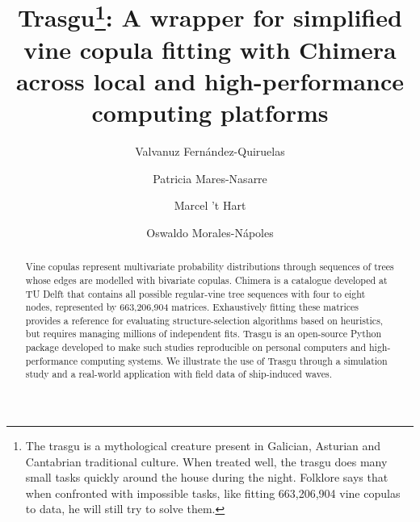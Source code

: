 \documentclass[preprint,12pt, a4paper]{elsarticle}
\begin{document}
\renewcommand{\labelenumii}{\arabic{enumi}.\arabic{enumii}}

\begin{frontmatter}
 



\title{Trasgu\footnote{The  trasgu is a mythological creature present in Galician, Asturian and Cantabrian traditional culture.  When treated well, the trasgu does many small tasks quickly around the house during the night. Folklore says that when confronted with impossible tasks, like fitting 663,206,904 vine copulas to data, he will still try to solve them.}: A wrapper for simplified vine copula fitting with Chimera across local and high-performance computing platforms}


\author[label1]{Valvanuz Fernández-Quiruelas}
\author[label2]{Patricia Mares-Nasarre}
\author[label3]{Marcel 't Hart}
\author[label2]{Oswaldo Morales-Nápoles}
\address[label1]{Departamento de Matemática Aplicada y Ciencias de la Computación, Universidad de Cantabria, Santander, Spain}
\address[label2]{Department of Hydraulic Engineering, Faculty of Civil Engineering and Geosciences, Delft University of Technology, Stevinweg 1, 2628 CN Delft, The Netherlands}
\address[label3]{Haskoning Nederland, PO Box 1132 Amersfoort, the Netherlands}

\begin{abstract}
Vine copulas represent multivariate probability distributions through
sequences of trees whose edges are modelled with bivariate copulas. Chimera is
a catalogue developed at TU Delft that contains all possible regular-vine tree
sequences with four to eight nodes, represented by 663,206,904 matrices.
Exhaustively fitting these matrices provides a reference for evaluating structure-selection algorithms based on heuristics, but requires managing
millions of independent fits. Trasgu is an open-source Python package developed
to make such studies reproducible on personal computers and high-performance
computing systems. We illustrate the use of Trasgu
through a simulation study and a real-world application with field data of ship-induced waves. 
\end{abstract}


\end{frontmatter}
\end{document}

